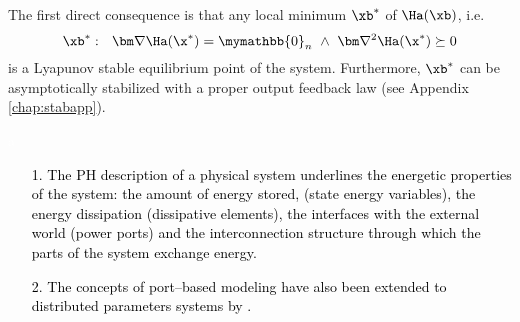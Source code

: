 %
The first direct consequence is that any local minimum $\xb^*$ of $\Ha(\xb)$, i.e.
\begin{equation}
    \xb^*:~~\bm\nabla\Ha(\x^*) = \mymathbb{0}_n~\land~\bm\nabla^2\Ha(\x^*)\succeq 0
\end{equation}
is a Lyapunov stable equilibrium point of the system. Furthermore, $\xb^*$ can be asymptotically stabilized with a proper output feedback law (see Appendix \ref{chap:stabapp}).
%
\textcolor{black}{
\begin{rem}\textcolor{white}{a}
    \begin{itemize}
	\item [1.] The PH description of a physical system underlines the energetic properties of the system: the amount of energy stored, (state energy variables), the energy dissipation (dissipative elements), the interfaces with the external world (power ports) and the interconnection structure through which the parts of the system exchange energy.
	\item [2.] The concepts of port--based modeling have also been extended to distributed parameters systems by \cite{MASCHKE200027,maschke2001hamiltonian} \cite{rodriguez2001stabilization,macchelli2003port,macchelli2004modeling,macchelli2004port,macchelli2004port2}.
    \end{itemize}
\end{rem}}

